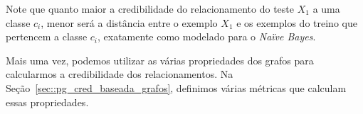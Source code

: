 Note que quanto maior a credibilidade do relacionamento do teste $X_1$ a uma classe $c_i$, menor será a distância entre o exemplo $X_1$ e os exemplos do treino que pertencem a classe $c_i$, exatamente como modelado para o \textit{Naïve Bayes}.

Mais uma vez, podemos utilizar as várias propriedades dos grafos para calcularmos a credibilidade dos relacionamentos. Na Seção~\ref{sec::pg_cred_baseada_grafos}, definimos várias métricas que calculam essas propriedades.

